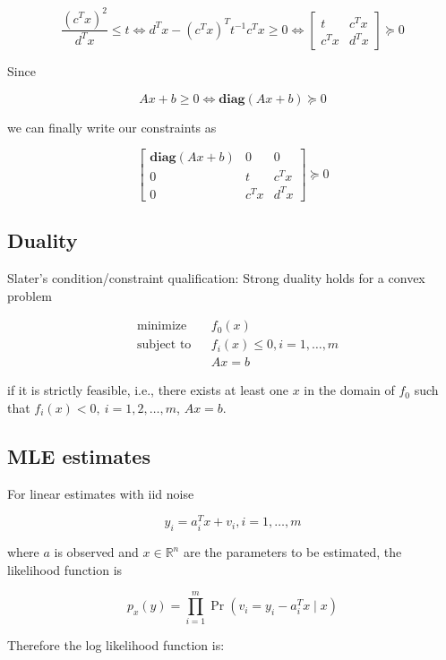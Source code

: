 \[
\frac{(c^Tx)^2}{d^Tx} \leq t \iff d^Tx - (c^Tx)^T t^{-1} c^Tx \geq 0  \iff  \begin{bmatrix}
    t      & c^Tx \\
    c^Tx & d^Tx
\end{bmatrix} \succeq 0 
\]

Since

\[
Ax + b \geq 0 \iff \textbf{diag}(Ax + b) \succeq 0
\]

we can finally write our constraints as 

\[
\begin{bmatrix}
    \textbf{diag}(Ax + b) & 0 & 0 \\
    0 & t      & c^Tx \\
    0 & c^Tx & d^Tx
\end{bmatrix} \succeq 0 
\]


\subsection{Duality}

\begin{theorem} \label{cvx.slater.thm} Slater's condition/constraint qualification: Strong duality holds for a convex problem

\[
\begin{aligned}
& {\text{minimize}}
& & f_0(x) \\
& \text{subject to}
& & f_i(x) \leq 0, i = 1, \ldots, m \\
& & & Ax = b
\end{aligned}
\]

if it is strictly feasible, i.e., there exists at least one \(x\) in the domain of \(f_0\) such that \(f_i(x) < 0, \ i=1,2, \ldots, m\), \(Ax=b\).

\end{theorem}

\subsection{MLE estimates}

For linear estimates with iid noise

\[
y_i = a_i^T x + v_i, i = 1, \ldots, m
\]

where \(a\) is observed and \(x \in \mathbb{R}^n\) are the parameters to be estimated, the likelihood function is

\[
p_x(y) = \prod_{i=1}^m \Pr(v_i = y_i - a_i^Tx \mid x)
\]

Therefore the log likelihood function is:

